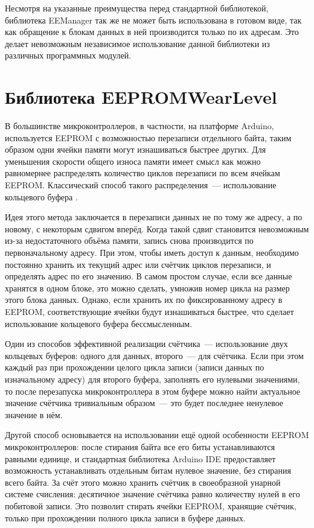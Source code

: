 Несмотря на указанные преимущества перед стандартной библиотекой, библиотека EEManager так же не может быть использована в готовом виде, так как обращение к блокам данных в ней производится только по их адресам.
Это делает невозможным независимое использование данной библиотеки из различных программных модулей.


\section{Библиотека EEPROMWearLevel}

В большинстве микроконтроллеров, в частности, на платформе Arduino, используется EEPROM с возможностью перезаписи отдельного байта, таким образом одни ячейки памяти могут изнашиваться быстрее других.
Для уменьшения скорости общего износа памяти имеет смысл как можно равномернее распределять количество циклов перезаписи по всем ячейкам EEPROM.
Классический способ такого распределения~--- использование кольцевого буфера \cite{web:circular-buffer}.

Идея этого метода заключается в перезаписи данных не по тому же адресу, а по новому, с некоторым сдвигом вперёд. Когда такой сдвиг становится невозможным из-за недостаточного объёма памяти, запись снова производится по первоначальному адресу.
При этом, чтобы иметь доступ к данным, необходимо постоянно хранить их текущий адрес или счётчик циклов перезаписи, и определять адрес по его значению.
В самом простом случае, если все данные хранятся в одном блоке, это можно сделать, умножив номер цикла на размер этого блока данных.
Однако, если хранить их по фиксированному адресу в EEPROM, соответствующие ячейки будут изнашиваться быстрее, что сделает использование кольцевого буфера бессмысленным.

Один из способов эффективной реализации счётчика~--- использование двух кольцевых буферов: одного для данных, второго~--- для счётчика.
Если при этом каждый раз при прохождении целого цикла записи (записи данных по изначальному адресу) для второго буфера, заполнять его нулевыми значениями, то после перезапуска микроконтроллера в этом буфере можно найти актуальное значение счётчика тривиальным образом~--- это будет последнее ненулевое значение в нём.

Другой способ основывается на использовании ещё одной особенности EEPROM микроконтроллеров: после стирания байта все его биты устанавливаются равными единице, и стандартная библиотека Arduino IDE предоставляет возможность устанавливать отдельным битам нулевое значение, без стирания всего байта.
За счёт этого можно хранить счётчик в своеобразной унарной системе счисления: десятичное значение счётчика равно количеству нулей в его побитовой записи.
Это позволит стирать ячейки EEPROM, хранящие счётчик, только при прохождении полного цикла записи в буфере данных.

